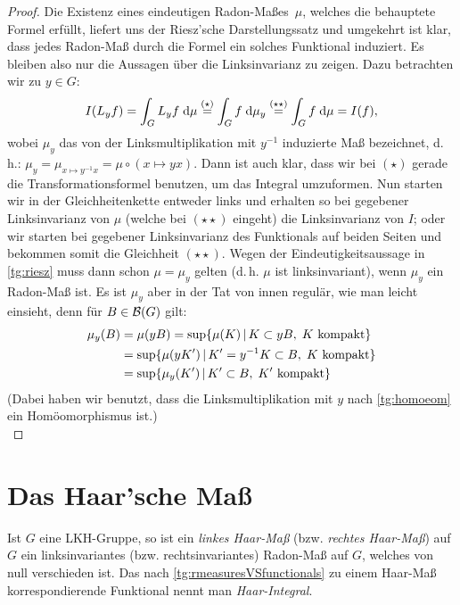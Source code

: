 \begin{proof}
    Die Existenz eines eindeutigen Radon-Maßes~$\mu$, welches die behauptete
    Formel erfüllt, liefert uns der Riesz'sche Darstellungssatz 
    und umgekehrt ist klar, dass jedes Radon-Maß durch die Formel ein solches
    Funktional induziert. Es bleiben also nur die Aussagen über die
    Linksinvarianz zu zeigen. Dazu betrachten wir zu $y\in G$:
    \[ I(L_yf) = \int_G L_yf \;\mathrm{d} \mu 
        \overset{(\star)}{=}
        \int_G f \;\mathrm{d} \mu_y 
        \overset{(\star\star)}{=} 
        \int_G f \;\mathrm{d} \mu = I(f)
    , \]
    wobei $\mu_y$ das von der Linksmultiplikation mit $y^{-1}$ induzierte
    Maß bezeichnet, d.\,h.:
    $\mu_y = \mu_{x\mapsto y^{-1}x} = \mu \circ (x\mapsto yx)$.
    Dann ist auch klar, dass wir bei $(\star)$ gerade die Transformationsformel
     benutzen, um das Integral umzuformen. 
    Nun starten wir in der Gleichheitenkette entweder links und erhalten so bei
    gegebener Linksinvarianz von $\mu$ (welche bei $(\star\star)$ eingeht)
    die Linksinvarianz von $I$; oder wir starten bei gegebener Linksinvarianz
    des Funktionals auf beiden Seiten und bekommen somit die Gleichheit
    $(\star\star)$. Wegen der Eindeutigkeitsaussage in \cref{tg:riesz} muss dann
    schon $\mu=\mu_y$ gelten (d.\,h. $\mu$ ist linksinvariant), 
    wenn $\mu_y$ ein Radon-Maß ist. Es ist $\mu_y$ aber in der Tat von innen
    regulär, wie man leicht einsieht, denn für $B\in\mathcal{B}(G)$ gilt:
    \begin{align*}
        \mu_y(B) &= \mu(yB)                                                 %
        = \sup\{ \mu(K) \Mid K\subset yB,\; K\text{ kompakt} \}             \\
        &= \sup\{ \mu(yK') \Mid K'=y^{-1}K\subset B,\; K\text{ kompakt} \}  \\
        &= \sup\{ \mu_y(K') \Mid K'\subset B,\; K'\text{ kompakt} \}        %
    \end{align*}
    (Dabei haben wir benutzt, dass die Linksmultiplikation mit $y$ nach
    \cref{tg:homoeom} ein Homöomorphismus ist.)
    \\
\end{proof}


\section{Das Haar'sche Maß}
\begin{thDef}
    Ist $G$ eine LKH-Gruppe, so ist ein \emph{linkes Haar-Maß} (bzw.
    \emph{rechtes Haar-Maß}) auf $G$ ein linksinvariantes (bzw.
    rechtsinvariantes) Radon-Maß auf $G$, welches von null verschieden ist.
    Das nach \cref{tg:rmeasuresVSfunctionals} zu einem Haar-Maß
    korrespondierende Funktional nennt man \emph{Haar-Integral}.
\end{thDef}

